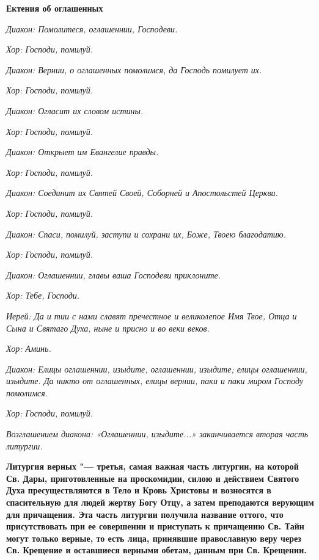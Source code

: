 \bfseries Ектения об оглашенных\normalfont{}


\itshape Диакон:\normalfont{} Помолитеся, оглашеннии, Господеви.


\itshape Хор:\normalfont{} Господи, помилуй.


\itshape Диакон:\normalfont{} Вернии, о оглашенных помолимся, да Господь помилует их.


\itshape Хор:\normalfont{} Господи, помилуй.


\itshape Диакон:\normalfont{} Огласит их словом истины.


\itshape Хор:\normalfont{} Господи, помилуй.


\itshape Диакон:\normalfont{} Открыет им Евангелие правды.


\itshape Хор:\normalfont{} Господи, помилуй.


\itshape Диакон:\normalfont{} Соединит их Святей Своей, Соборней и Апостольстей Церкви.


\itshape Хор:\normalfont{} Господи, помилуй.


\itshape Диакон:\normalfont{} Спаси, помилуй, заступи и сохрани их, Боже, Твоею благодатию.


\itshape Хор:\normalfont{} Господи, помилуй.


\itshape Диакон:\normalfont{} Оглашеннии, главы ваша Господеви приклоните.


\itshape Хор:\normalfont{} Тебе, Господи.


\itshape Иерей:\normalfont{} Да и тии с нами славят пречестное и великолепое Имя Твое, Отца и Сына и Святаго Духа, ныне и присно и во веки веков.


\itshape Хор:\normalfont{} Аминь.


\itshape Диакон:\normalfont{} Елицы оглашеннии, изыдите, оглашеннии, изыдите; елицы оглашеннии, изыдите. Да никто от оглашенных, елицы вернии, паки и паки миром Господу помолимся.


\itshape Хор:\normalfont{} Господи, помилуй.


\itshape Возглашением диакона: «Оглашеннии, изыдите...» заканчивается вторая часть литургии.\normalfont{}

\mychapterending




\bfseries Литургия верных\normalfont{} "--- третья, самая важная часть литургии, на которой Св.
Дары, приготовленные на проскомидии, силою и действием Святого
Духа пресуществляются в Тело и Кровь Христовы и возносятся в
спасительную для людей жертву Богу Отцу, а затем преподаются верующим
для причащения. Эта часть литургии получила название оттого, что
присутствовать при ее совершении и приступать к причащению Св. Тайн
могут только верные, то есть лица, принявшие православную веру
через Св. Крещение и оставшиеся верными обетам, данным при Св.
Крещении.


